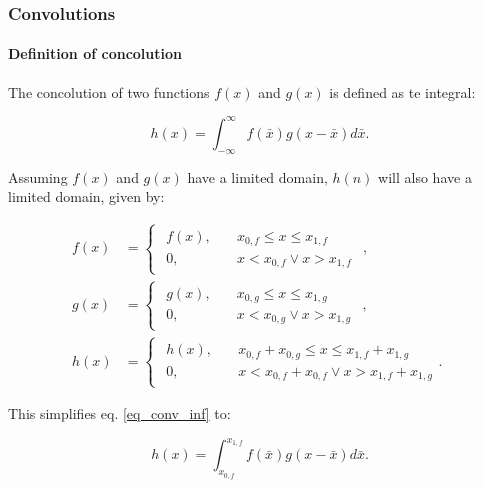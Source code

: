 \subsubsection{Convolutions}
\paragraph{Definition of concolution}

The concolution of two functions $f(x)$ and $g(x)$ is defined as te integral:

\begin{equation}\label{eq_conv_inf}
h(x) = \int_{-\infty}^\infty f(\bar{x})g(x-\bar{x}) d\bar{x}.
\end{equation}

Assuming $f(x)$ and $g(x)$ have a limited domain, $h(n)$ will also have a limited domain, given by:

\begin{equation}
	\begin{aligned}
		f(x) &= \begin{cases}
			\begin{aligned}
				f(x), \quad &x_{0,f} \leq x \leq x_{1,f}\\
				0, \quad &x < x_{0,f} \vee x>x_{1,f}
			\end{aligned}
		\end{cases},\\
		g(x) &= \begin{cases}
			\begin{aligned}
				g(x), \quad &x_{0,g} \leq x \leq x_{1,g}\\
				0, \quad &x < x_{0,g} \vee x>x_{1,g}
			\end{aligned}
		\end{cases},\\
		h(x) &= \begin{cases}
			\begin{aligned}
				h(x), \quad &x_{0,f} + x_{0,g} \leq x \leq x_{1,f} + x_{1,g}\\
				0, \quad &x < x_{0,f} +x_{0,f} \vee x>x_{1,f} + x_{1,g}
			\end{aligned}.
		\end{cases}
	\end{aligned}
\end{equation}

This simplifies eq. \eqref{eq_conv_inf} to:

\begin{equation}
h(x) = \int_{x_{0,f}}^{x_{1,f}} f(\bar{x})g(x-\bar{x}) d\bar{x}.
\end{equation}







